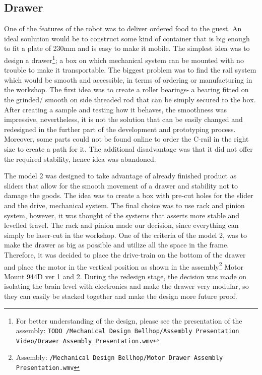 \documentclass[11pt]{article}
\begin{document}
\subsection*{Drawer}
One of the features of the robot was to deliver ordered food to the guest. An ideal soulution would be to construct some kind of container that is big enough to fit a plate of 230mm and is easy to make it mobile. The simplest idea was to design a drawer\footnote{For better understanding of the design, please see the presentation of the assembly: \texttt{TODO /Mechanical Design Bellhop/Assembly Presentation Video/Drawer Assembly Presentation.wmv}}; a box on which mechanical system can be mounted with no trouble to make it transportable. The biggest problem was to find the rail system which would be smooth and accessible, in terms of ordering or manufacturing in the workshop. The first idea was to create a roller bearings- a bearing fitted on the grinded/ smooth on side threaded rod that can be simply secured to the box. After creating a sample and testing how it behaves, the smoothness was impressive, nevertheless, it is not the solution that can be easily changed and redesigned in the further part of the development and prototyping process. Moreover, some parts could not be found online to order the C-rail in the right size to create a path for it. The additional disadvantage was that it did not offer the required stability, hence idea was abandoned. 


The model 2 was designed to take advantage of already finished product as sliders that allow for the smooth movement of a drawer and stability not to damage the goods. The idea was to create a box with pre-cut holes for the slider and the drive, mechanical system. The final choice was to use rack and pinion system, however, it was thought of the systems that asserts more stable and levelled travel. The rack and pinion made our decision, since everything can simply be laser-cut in the workshop. One of the criteria of the model 2, was to make the drawer as big as possible and utilize all the space in the frame. Therefore, it was decided to place the drive-train on the bottom of the drawer and place the motor in the vertical position as shown in the assembly\footnote{Assembly: \texttt{/Mechanical Design Bellhop/Motor Drawer Assembly Presentation.wmv}} Motor Mount 944D ver 1 and 2. During the redesign stage, the decision was made on isolating the brain level with electronics and make the drawer very modular, so they can easily be stacked together and make the design more future proof.
\end{document}
